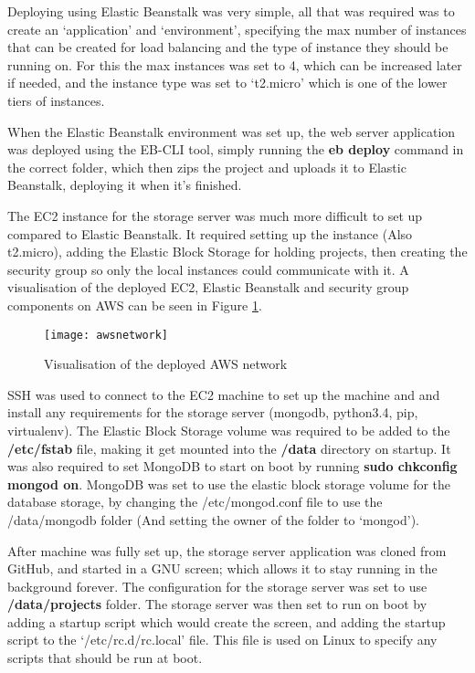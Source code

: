 Deploying using Elastic Beanstalk was very simple, all that was required was to create an `application' and `environment', specifying the max number of instances that can be created for load balancing and the type of instance they should be running on. For this the max instances was set to 4, which can be increased later if needed, and the instance type was set to `t2.micro' which is one of the lower tiers of instances.

When the Elastic Beanstalk environment was set up, the web server application was deployed using the EB-CLI tool, simply running the \textbf{eb deploy} command in the correct folder, which then zips the project and uploads it to Elastic Beanstalk, deploying it when it's finished.

The EC2 instance for the storage server was much more difficult to set up compared to Elastic Beanstalk. It required setting up the instance (Also t2.micro), adding the Elastic Block Storage for holding projects, then creating the security group so only the local instances could communicate with it. A visualisation of the deployed EC2, Elastic Beanstalk and security group components on AWS can be seen in Figure \ref{fig:awsnetwork}.

\begin{figure}[h]
	\centering
	\texttt{[image: awsnetwork]}
	\caption{Visualisation of the deployed AWS network}
	\label{fig:awsnetwork}
\end{figure}

SSH was used to connect to the EC2 machine to set up the machine and and install any requirements for the storage server (mongodb, python3.4, pip, virtualenv). The Elastic Block Storage volume was required to be added to the \textbf{/etc/fstab} file, making it get mounted into the \textbf{/data} directory on startup. It was also required to set MongoDB to start on boot by running \textbf{sudo chkconfig mongod on}. MongoDB was set to use the elastic block storage volume for the database storage, by changing the /etc/mongod.conf file to use the /data/mongodb folder (And setting the owner of the folder to `mongod').

After machine was fully set up, the storage server application was cloned from GitHub, and started in a GNU screen; which allows it to stay running in the background forever. The configuration for the storage server was set to use \textbf{/data/projects} folder. The storage server was then set to run on boot by adding a startup script which would create the screen, and adding the startup script to the `/etc/rc.d/rc.local' file. This file is used on Linux to specify any scripts that should be run at boot.

